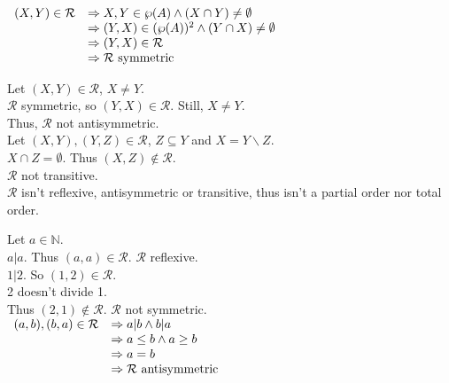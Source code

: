 \documentclass[a4paper, 11pt]{article}
\begin{document}
\begin{myEnumerate}
\begin{myEnumerate}
\begin{myEnumerate}
            \(
            \begin{array}{llr}
                 (X, Y)\in \mathcal{R} & \Rightarrow X, Y\in \wp (A)\land (X\cap Y)\neq \emptyset \\
                 & \Rightarrow (Y, X)\in (\wp (A))^{2} \land (Y\cap X)\neq \emptyset \\
                 & \Rightarrow (Y, X)\in \mathcal{R} \\
                 & \Rightarrow \mathcal{R} \textnormal{ symmetric}
            \end{array} \\\\ \)
            
            Let $(X, Y)\in \mathcal{R}$, $X\neq Y$. \\
            $\mathcal{R}$ symmetric, so $(Y, X)\in \mathcal{R}$. Still, $X\neq Y$. \\
            Thus, $\mathcal{R}$ not antisymmetric. \\
            
            Let $(X, Y), (Y, Z)\in \mathcal{R}$, $Z\subseteq Y$ and $X = Y\backslash Z$. \\
            $X\cap Z = \emptyset$.
            Thus $(X, Z)\notin \mathcal{R}$. \\
            $\mathcal{R}$ not transitive. \\
            
            $\mathcal{R}$ isn't reflexive, antisymmetric or transitive, thus isn't a partial order nor total order. \\
            
            \item
            Let $a\in \mathbb{N}$. \\
            $a|a$. Thus $(a, a)\in \mathcal{R}$.
            $\mathcal{R}$ reflexive. \\
            
            $1|2$. So $(1, 2)\in \mathcal{R}$. \\
            2 doesn't divide 1. \\
            Thus $(2, 1)\notin \mathcal{R}$. $\mathcal{R}$ not symmetric. \\
            
            \( \begin{array}{llr}
                 (a, b), (b, a)\in \mathcal{R} & \Rightarrow a|b \land b|a \\
                 & \Rightarrow a\leq b\land a\geq b \\
                 & \Rightarrow a = b \\
                 & \Rightarrow \mathcal{R} \textnormal{ antisymmetric}
            \end{array} \\\\ \)
            

\end{myEnumerate}
\end{myEnumerate}
\end{myEnumerate}
\end{document}

